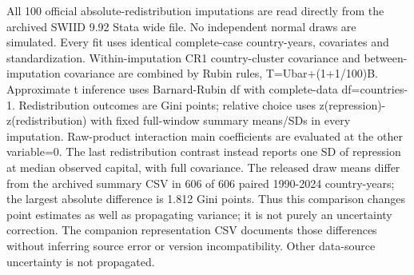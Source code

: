 \begin{table}[htbp]\centering
\caption{H2. SWIID uncertainty propagated through 100 released imputations}
\label{tab:measurement_swiid}
\small
{}
\begin{tablenotes}\footnotesize All 100 official absolute-redistribution imputations are read directly from the archived SWIID 9.92 Stata wide file. No independent normal draws are simulated. Every fit uses identical complete-case country-years, covariates and standardization. Within-imputation CR1 country-cluster covariance and between-imputation covariance are combined by Rubin rules, T=Ubar+(1+1/100)B. Approximate t inference uses Barnard-Rubin df with complete-data df=countries-1. Redistribution outcomes are Gini points; relative choice uses z(repression)-z(redistribution) with fixed full-window summary means/SDs in every imputation. Raw-product interaction main coefficients are evaluated at the other variable=0. The last redistribution contrast instead reports one SD of repression at median observed capital, with full covariance. The released draw means differ from the archived summary CSV in 606 of 606 paired 1990-2024 country-years; the largest absolute difference is 1.812 Gini points. Thus this comparison changes point estimates as well as propagating variance; it is not purely an uncertainty correction. The companion representation CSV documents those differences without inferring source error or version incompatibility. Other data-source uncertainty is not propagated.\end{tablenotes}
\end{table}